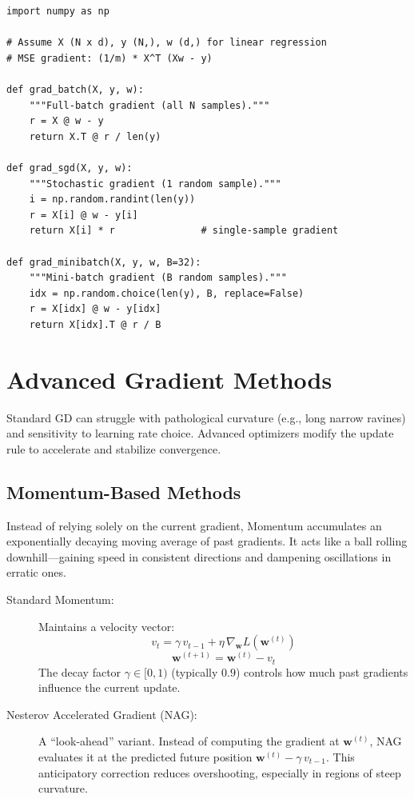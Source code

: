 \begin{lstlisting}[style=pythonstyle]
import numpy as np

# Assume X (N x d), y (N,), w (d,) for linear regression
# MSE gradient: (1/m) * X^T (Xw - y)

def grad_batch(X, y, w):
    """Full-batch gradient (all N samples)."""
    r = X @ w - y
    return X.T @ r / len(y)

def grad_sgd(X, y, w):
    """Stochastic gradient (1 random sample)."""
    i = np.random.randint(len(y))
    r = X[i] @ w - y[i]
    return X[i] * r               # single-sample gradient

def grad_minibatch(X, y, w, B=32):
    """Mini-batch gradient (B random samples)."""
    idx = np.random.choice(len(y), B, replace=False)
    r = X[idx] @ w - y[idx]
    return X[idx].T @ r / B
\end{lstlisting}

\section*{Advanced Gradient Methods}

Standard GD can struggle with pathological curvature (e.g., long narrow ravines) and sensitivity to learning rate choice. Advanced optimizers modify the update rule to accelerate and stabilize convergence.

\subsection*{Momentum-Based Methods}

\begin{definition}[Momentum]
Instead of relying solely on the current gradient, Momentum accumulates an exponentially decaying moving average of past gradients. It acts like a ball rolling downhill---gaining speed in consistent directions and dampening oscillations in erratic ones.
\end{definition}

\begin{description}
    \item[Standard Momentum:] Maintains a velocity vector:
    $$v_t = \gamma \, v_{t-1} + \eta \,\nabla_{\mathbf{w}} L(\mathbf{w}^{(t)})$$
    $$\mathbf{w}^{(t+1)} = \mathbf{w}^{(t)} - v_t$$
    The decay factor $\gamma \in [0,1)$ (typically $0.9$) controls how much past gradients influence the current update.

    \item[Nesterov Accelerated Gradient (NAG):] A ``look-ahead'' variant. Instead of computing the gradient at $\mathbf{w}^{(t)}$, NAG evaluates it at the predicted future position $\mathbf{w}^{(t)} - \gamma \, v_{t-1}$. This anticipatory correction reduces overshooting, especially in regions of steep curvature.
\end{description}

